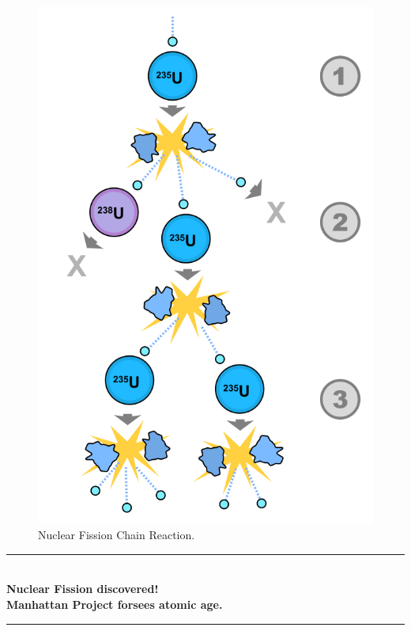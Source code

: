 \documentclass[11pt]{article}
\begin{document}
\begin{multicols}{2}
\begin{figure}[H]
\centering
\includegraphics[scale=0.2]{Images/Fission_chain_reaction.png}
\caption{Nuclear Fission Chain Reaction. \cite{ChainReact}}
\label{Chain Reaction}
\end{figure} 
\vspace{-0.5cm}

\begin{center}
    \rule{9cm}{0.05cm} \\ [0.2cm]
    \textbf{\Large{Nuclear Fission discovered!}} \\
    \textbf{Manhattan Project forsees atomic age.} \\ 
    \rule{9cm}{0.1cm}\\ [-0.1cm]
\end{center} 
\vspace{-0.2cm}


\end{multicols}
\end{document}
